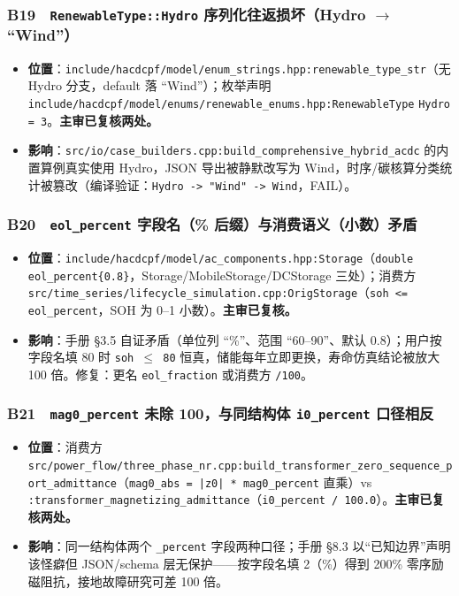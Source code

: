 \documentclass[11pt,a4paper,fontset=fandol]{ctexart}
\newcommand{\file}[1]{\texttt{#1}}
\begin{document}
\subsubsection*{B19　\texttt{RenewableType::Hydro} 序列化往返损坏（Hydro $\to$ ``Wind''）}
\begin{itemize}
  \item \textbf{位置}：\file{include/hacdcpf/model/enum\_strings.hpp:renewable\_type\_str}（无 Hydro 分支，default 落 ``Wind''）；枚举声明 \file{include/hacdcpf/model/enums/renewable\_enums.hpp:RenewableType} \texttt{Hydro = 3}。\textbf{主审已复核两处。}
  \item \textbf{影响}：\file{src/io/case\_builders.cpp:build\_comprehensive\_hybrid\_acdc} 的内置算例真实使用 Hydro，JSON 导出被静默改写为 Wind，时序/碳核算分类统计被篡改（编译验证：\texttt{Hydro -> "Wind" -> Wind}，FAIL）。
\end{itemize}

\subsubsection*{B20　\texttt{eol\_percent} 字段名（\% 后缀）与消费语义（小数）矛盾}
\begin{itemize}
  \item \textbf{位置}：\file{include/hacdcpf/model/ac\_components.hpp:Storage}（\texttt{double eol\_percent\{0.8\}}，Storage/MobileStorage/DCStorage 三处）；消费方 \file{src/time\_series/lifecycle\_simulation.cpp:OrigStorage}（\texttt{soh <= eol\_percent}，SOH 为 0--1 小数）。\textbf{主审已复核。}
  \item \textbf{影响}：手册 \S 3.5 自证矛盾（单位列 ``\%''、范围 ``60--90''、默认 0.8）；用户按字段名填 80 时 \texttt{soh $\le$ 80} 恒真，储能每年立即更换，寿命仿真结论被放大 100 倍。修复：更名 \texttt{eol\_fraction} 或消费方 \texttt{/100}。
\end{itemize}

\subsubsection*{B21　\texttt{mag0\_percent} 未除 100，与同结构体 \texttt{i0\_percent} 口径相反}
\begin{itemize}
  \item \textbf{位置}：消费方 \file{src/power\_flow/three\_phase\_nr.cpp:build\_transformer\_zero\_sequence\_port\_admittance}（\texttt{mag0\_abs = |z0| * mag0\_percent} 直乘）vs \file{:transformer\_magnetizing\_admittance}（\texttt{i0\_percent / 100.0}）。\textbf{主审已复核两处。}
  \item \textbf{影响}：同一结构体两个 \texttt{\_percent} 字段两种口径；手册 \S 8.3 以``已知边界''声明该怪癖但 JSON/schema 层无保护——按字段名填 2（\%）得到 200\% 零序励磁阻抗，接地故障研究可差 100 倍。
\end{itemize}
\end{document}
